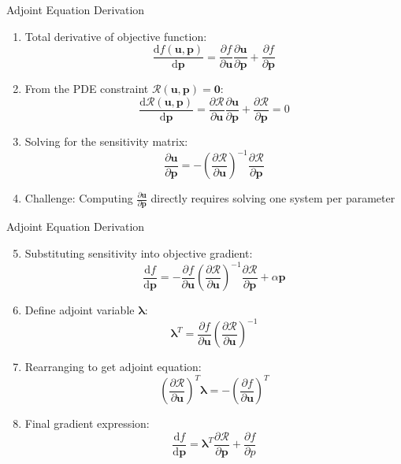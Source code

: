\documentclass[10pt,aspectratio=169]{beamer}
\begin{document}
\begin{frame}{Adjoint Equation Derivation}
\small
\begin{enumerate}
    \item Total derivative of objective function:
      \[
        \frac{\mathrm{d}f(\mathbf{u},\mathbf{p})}{\mathrm{d}\mathbf{p}} = \frac{\partial f}{\partial \mathbf{u}}\frac{\partial \mathbf{u}}{\partial\mathbf{p}} + \frac{\partial f}{\partial \mathbf{p}}
      \]
  
      
    \item From the PDE constraint $\mathcal{R}(\mathbf{u},\mathbf{p})=\mathbf{0}$:
      \[
        \frac{\mathrm{d}\mathcal{R}(\mathbf{u},\mathbf{p})}{\mathrm{d}\mathbf{p}} = \frac{\partial \mathcal{R}}{\partial \mathbf{u}}\frac{\partial \mathbf{u}}{\partial\mathbf{p}} + \frac{\partial \mathcal{R}}{\partial \mathbf{p}} = 0
      \]
      
    \item Solving for the sensitivity matrix:
      \[
        \frac{\partial \mathbf{u}}{\partial\mathbf{p}} = -\left(\frac{\partial \mathcal{R}}{\partial \mathbf{u}}\right)^{-1}\frac{\partial \mathcal{R}}{\partial \mathbf{p}}
      \]
      
    \item Challenge: Computing $\frac{\partial \mathbf{u}}{\partial\mathbf{p}}$ directly requires solving one system per parameter
\end{enumerate}
\end{frame}

\begin{frame}{Adjoint Equation Derivation}
\small
\begin{enumerate}
    \setcounter{enumi}{4}
    \item Substituting sensitivity into objective gradient:
      \[
        \frac{\mathrm{d}f}{\mathrm{d}\mathbf{p}} = -\frac{\partial f}{\partial \mathbf{u}}\left(\frac{\partial \mathcal{R}}{\partial \mathbf{u}}\right)^{-1}\frac{\partial \mathcal{R}}{\partial \mathbf{p}} + \alpha \mathbf{p}
      \]
      
    \item Define adjoint variable $\boldsymbol{\lambda}$:
      \[
        \boldsymbol{\lambda}^T = \frac{\partial f}{\partial \mathbf{u}}\left(\frac{\partial \mathcal{R}}{\partial \mathbf{u}}\right)^{-1}
      \]
      
    \item Rearranging to get adjoint equation:
      \[
        \left(\frac{\partial \mathcal{R}}{\partial \mathbf{u}}\right)^T \boldsymbol{\lambda} = -\left(\frac{\partial f}{\partial \mathbf{u}}\right)^T
      \]
      
    \item Final gradient expression:
      \[
        \frac{\mathrm{d}f}{\mathrm{d}\mathbf{p}} = \boldsymbol{\lambda}^T \frac{\partial \mathcal{R}}{\partial \mathbf{p}} +  \frac{\partial f}{\partial p}
      \]
\end{enumerate}
\end{frame}
\end{document}
